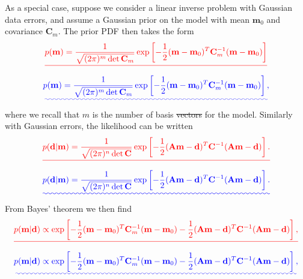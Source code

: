 \documentclass[a4paper,12pt]{paper}
\providecommand{\DIFadd}[1]{{\protect\color{blue}\uwave{#1}}} %
\providecommand{\DIFdel}[1]{{\protect\color{red}\sout{#1}}}                      %
\providecommand{\DIFaddbegin}{} %
\providecommand{\DIFaddend}{} %
\providecommand{\DIFdelbegin}{} %
\providecommand{\DIFdelend}{} %
\begin{document}
As a special case, suppose we consider a linear inverse problem with Gaussian data errors, and assume a Gaussian 
prior on the model with mean $\mathbf{m}_{0}$ and covariance $\mathbf{C}_{m}$. The prior PDF then takes the form
\DIFdelbegin \begin{displaymath}
    \DIFdel{p(\mathbf{m}) = \frac{1}{\sqrt{(2\pi)^{m}\det \mathbf{C}_{m}}} \exp\left[-\frac{1}{2}(\mathbf{m}-\mathbf{m}_{0})^{T}
    \mathbf{C}_{m}^{-1}(\mathbf{m}-\mathbf{m}_{0})\right]
}\end{displaymath}%
\DIFdelend \DIFaddbegin \begin{equation}
    \DIFadd{p(\mathbf{m}) = \frac{1}{\sqrt{(2\pi)^{m}\det \mathbf{C}_{m}}} \exp\left[-\frac{1}{2}(\mathbf{m}-\mathbf{m}_{0})^{T}
    \mathbf{C}_{m}^{-1}(\mathbf{m}-\mathbf{m}_{0})\right],
    \label{eq:38}
}\end{equation}\DIFaddend 
where we recall that $m$ is the number of basis \DIFdelbegin \DIFdel{vectors }\DIFdelend \DIFaddbegin \DIFadd{functions }\DIFaddend for the model. Similarly with Gaussian errors, the likelihood can be written
\DIFdelbegin \begin{displaymath}
    \DIFdel{p(\mathbf{d}|\mathbf{m}) = \frac{1}{\sqrt{(2\pi)^{n}\det \mathbf{C}}} \exp\left[-\frac{1}{2}(\mathbf{A}\mathbf{m}
    -\mathbf{d})^{T}\mathbf{C}^{-1}(\mathbf{A}\mathbf{m}-\mathbf{d})\right].
}\end{displaymath}%
\DIFdelend \DIFaddbegin \begin{equation}
    \DIFadd{p(\mathbf{d}|\mathbf{m}) = \frac{1}{\sqrt{(2\pi)^{n}\det \mathbf{C}}} \exp\left[-\frac{1}{2}(\mathbf{A}\mathbf{m}
    -\mathbf{d})^{T}\mathbf{C}^{-1}(\mathbf{A}\mathbf{m}-\mathbf{d})\right].
    \label{eq:39}
}\end{equation}\DIFaddend 
From Bayes' theorem we then find
\DIFdelbegin \begin{displaymath}
    \DIFdel{p(\mathbf{m}|\mathbf{d}) \propto \exp\left[-\frac{1}{2}(\mathbf{m}-\mathbf{m}_{0})^{T}\mathbf{C}_{m}^{-1}(\mathbf{m}
    -\mathbf{m}_{0}) - \frac{1}{2}(\mathbf{A}\mathbf{m}-\mathbf{d})^{T}\mathbf{C}^{-1}(\mathbf{A}\mathbf{m}-\mathbf{d})\right],
}\end{displaymath}%
\DIFdelend \DIFaddbegin \begin{equation}
    \DIFadd{p(\mathbf{m}|\mathbf{d}) \propto \exp\left[-\frac{1}{2}(\mathbf{m}-\mathbf{m}_{0})^{T}\mathbf{C}_{m}^{-1}(\mathbf{m}
    -\mathbf{m}_{0}) - \frac{1}{2}(\mathbf{A}\mathbf{m}-\mathbf{d})^{T}\mathbf{C}^{-1}(\mathbf{A}\mathbf{m}-\mathbf{d})\right],
    \label{eq:40}
}\end{equation}\DIFaddend 
\end{document}
